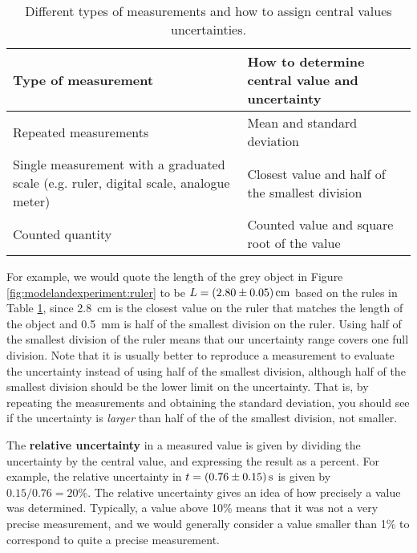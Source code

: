 \begin{table}[!h]
\centering
\begin{tabular}{p{3in}p{3in}} 
\textbf{Type of measurement} &\textbf{How to determine central value and uncertainty} \\
\hline
\hline
Repeated measurements & Mean and standard deviation \\ \hline
Single measurement with a graduated scale (e.g. ruler, digital scale, analogue meter) & Closest value and half of the smallest division\\ \hline
Counted quantity & Counted value and square root of the value \\ \hline
\end{tabular}
\caption{\label{tab:modelandexperiment:uncertainties} Different types of measurements and how to assign central values uncertainties.}
\end{table}
For example, we would quote the length of the grey object in Figure \ref{fig:modelandexperiment:ruler} to be $L=\SI{2.8\pm0.05}{cm}$ based on the rules in Table \ref{tab:modelandexperiment:uncertainties}, since \SI{2.8}{cm} is the closest value on the ruler that matches the length of the object and \SI{0.5}{mm} is half of the smallest division on the ruler. Using half of the smallest division of the ruler means that our uncertainty range covers one full division. Note that it is usually better to reproduce a measurement to evaluate the uncertainty instead of using half of the smallest division, although half of the smallest division should be the lower limit on the uncertainty. That is, by repeating the measurements and obtaining the standard deviation, you should see if the uncertainty is \textit{larger} than half of the of the smallest division, not smaller.

The \textbf{relative uncertainty} in a measured value is given by dividing the uncertainty by the central value, and expressing the result as a percent. For example, the relative uncertainty in $t=\SI{0.76\pm 0.15}{s}$ is given by $0.15/0.76=20\%$. The relative uncertainty gives an idea of how precisely a value was determined. Typically, a value above 10\% means that it was not a very precise measurement, and we would generally consider a value smaller than 1\% to correspond to quite a precise measurement. 

